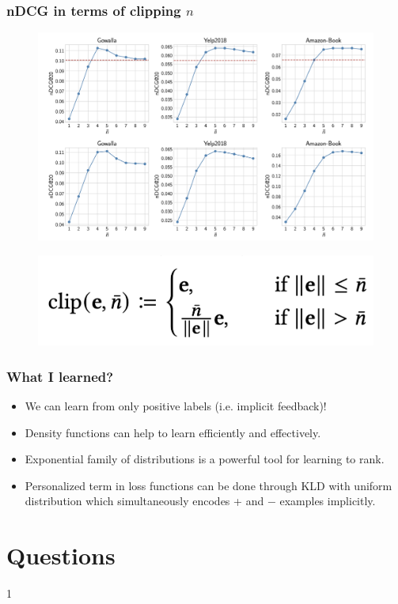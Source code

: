 \documentclass{beamer}
\begin{document}
\begin{frame}
\frametitle{nDCG in terms of clipping $n$} \vspace{-2mm}
\begin{figure}[h] 
\includegraphics[width=0.9 \textwidth]{clipping-n}
\end{figure} \pause \vspace{-5mm}

\begin{figure}[h] 
\includegraphics[width=0.4 \textwidth]{clip}
\end{figure}
\end{frame}


\begin{frame}
\frametitle{What I learned?}
\begin{itemize} \pause
\item We can learn from only positive labels (i.e. implicit feedback)! \pause
\item Density functions can help to learn efficiently and effectively. \pause
\item Exponential family of distributions is a powerful tool for learning to rank. \pause
\item Personalized term in loss functions can be done through KLD with uniform distribution which simultaneously encodes {\color{blue} +} and {\color{red} $-$} examples implicitly. 
\end{itemize}
\end{frame}


\section*{Questions}
{\color{white}1}
\begin{center} 
{\huge {}}
\end{center}
\end{document}
